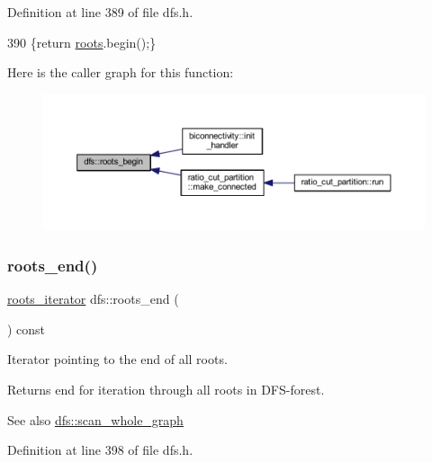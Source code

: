 Definition at line 389 of file dfs.\+h.


\begin{DoxyCode}
390     \{\textcolor{keywordflow}{return} \mbox{\hyperlink{classdfs_a0bbd5cb8df26c891b74dadd84b46a06b}{roots}}.begin();\}
\end{DoxyCode}
Here is the caller graph for this function\+:
\nopagebreak
\begin{figure}[H]
\begin{center}
\leavevmode
\includegraphics[width=350pt]{classdfs_af56fa2b736f0b924dba1257e18ba4b61_icgraph}
\end{center}
\end{figure}
\mbox{\label{classdfs_ae1a61d8c2d8d99059cab410f766ec73f}} 
\subsubsection{\texorpdfstring{roots\+\_\+end()}{roots\_end()}}
{\footnotesize\ttfamily \mbox{\hyperlink{classdfs_a1ea6e8eb2766ac95ac48a8523359065a}{roots\+\_\+iterator}} dfs\+::roots\+\_\+end (\begin{DoxyParamCaption}{ }\end{DoxyParamCaption}) const\hspace{0.3cm}{\ttfamily [inline]}}



Iterator pointing to the end of all roots. 

\begin{DoxyReturn}{Returns}
end for iteration through all roots in D\+F\+S-\/forest. 
\end{DoxyReturn}
\begin{DoxySeeAlso}{See also}
\mbox{\hyperlink{classdfs_aa7c864a6f3a120720138b187b3ed95b5}{dfs\+::scan\+\_\+whole\+\_\+graph}} 
\end{DoxySeeAlso}


Definition at line 398 of file dfs.\+h.


